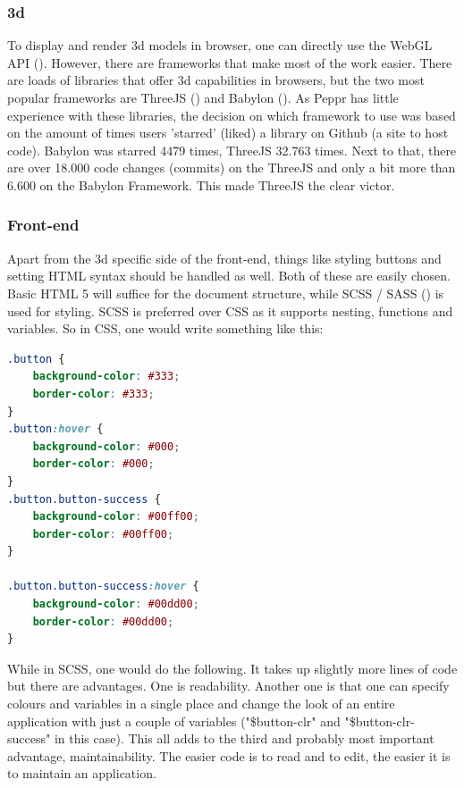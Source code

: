 \subsubsection{3d}
\label{subsub: 3d}
To display and render 3d models in browser, one can directly use the WebGL API (\cite{webGL}). However, there are frameworks that make most of the work easier. There are loads of libraries that offer 3d capabilities in browsers, but the two most popular frameworks are ThreeJS (\cite{threejs}) and Babylon (\cite{babylon}). As Peppr has little experience with these libraries, the decision on which framework to use was based on the amount of times users 'starred' (liked) a library on Github (a site to host code). Babylon was starred 4479 times, ThreeJS 32.763 times. Next to that, there are over 18.000 code changes (commits) on the ThreeJS and only a bit more than 6.600 on the Babylon Framework. This made ThreeJS the clear victor.

\subsubsection{Front-end}
\label{subsub: frontEnd}
Apart from the 3d specific side of the front-end, things like styling buttons and setting HTML syntax should be handled as well. Both of these are easily chosen. Basic HTML 5 will suffice for the document structure, while SCSS / SASS (\cite{scss}) is used for styling. SCSS is preferred over CSS as it supports nesting, functions and variables. So in CSS, one would write something like this:

\begin{lstlisting}[language=CSS]
.button {
	background-color: #333;
	border-color: #333;
}
.button:hover {
	background-color: #000;
	border-color: #000;
}
.button.button-success {
	background-color: #00ff00;
	border-color: #00ff00;
}

.button.button-success:hover {
	background-color: #00dd00;
	border-color: #00dd00;
}
\end{lstlisting}

\clearpage
While in SCSS, one would do the following. It takes up slightly more lines of code but there are advantages. One is readability. Another one is that one can specify colours and variables in a single place and change the look of an entire application with just a couple of variables ("\$button-clr" and "\$button-clr-success" in this case). This all adds to the third and probably most important advantage, maintainability. The easier code is to read and to edit, the easier it is to maintain an application.

